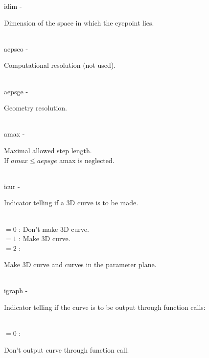         \>\>    {\fov idim}\> - \>  \begin{minipg2}
                     Dimension of the space in which the {\fov eyepoint}
                       lies.
                               \end{minipg2}\\[0.8ex]
        \>\>    {\fov aepsco}\> - \>  \begin{minipg2}
                     Computational resolution (not used).
                               \end{minipg2}\\
        \>\>    {\fov aepsge}\> - \>  \begin{minipg2}
                     Geometry resolution.
                               \end{minipg2}\\
        \>\>    {\fov amax}\> - \>  \begin{minipg2}
                     Maximal allowed step length.\\ If $amax\leq aepsge$
                       {\fov amax} is neglected.
                               \end{minipg2}\\[0.8ex]
        \>\>    {\fov icur}\> - \>  \begin{minipg2}
                    Indicator telling if a 3D curve is to be made.
                               \end{minipg2}\\
                    \>\>\>\>\> $= 0$ \> : Don't make 3D curve.\\
                    \>\>\>\>\> $= 1$ \> : Make 3D curve.\\
                    \>\>\>\>\> $= 2$ \> : \begin{minipg5}
                                            Make 3D curve and curves in
                                            the parameter plane.
                                          \end{minipg5}\\[0.8ex]
        \>\>    {\fov igraph}\> - \>  \begin{minipg2}
                     Indicator telling if the curve is to be output
                       through function calls:\\
                               \end{minipg2}\\
                    \>\>\>\>\> $= 0$ \> : \begin{minipg5}
                                            Don't output curve through
                                            function call.
                                          \end{minipg5}\\[0.3ex]
